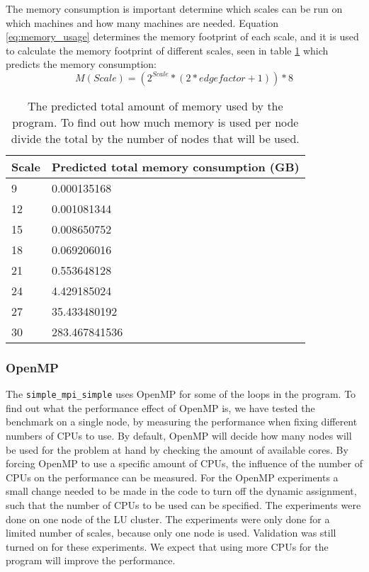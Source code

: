 The memory consumption is important determine which scales can be run on which machines and how many machines are needed. Equation \ref{eq:memory_usage} determines the memory footprint of each scale, and it is used to calculate the memory footprint of different scales, seen in table \ref{tab:calculation memory consumption} which predicts the memory consumption:
\begin{equation}
\label{eq:memory_usage}
M(Scale) = (2^{Scale} *(2*edgefactor + 1)) * 8
\end{equation}
\begin{table} [!h]
	\begin{center}
		\begin{tabular}{|l|l|}
			\hline
			Scale & Predicted total memory consumption (GB) \\ \hline
			9 &  0.000135168 \\ \hline
			12 & 0.001081344 \\ \hline
			15 & 0.008650752 \\ \hline
			18 & 0.069206016 \\ \hline
			21 & 0.553648128 \\ \hline
			24 & 4.429185024 \\ \hline
			27 & 35.433480192 \\ \hline
			30 & 283.467841536 \\ \hline
		\end{tabular}
	\end{center}
	
	\caption{The predicted total amount of memory used by the program. To find out how much memory is used per node divide the total by the number of nodes that will be used.}
	\label{tab:calculation memory consumption}
\end{table}


\subsubsection{OpenMP}
The \texttt{simple\_mpi\_simple} uses OpenMP for some of the loops in the program. To find out what the performance effect of OpenMP is, we have tested the benchmark on a single node, by measuring the performance when fixing different numbers of CPUs to use. By default, OpenMP will decide how many nodes will be used for the problem at hand by checking the amount of available cores. By forcing OpenMP to use a specific amount of CPUs, the influence of the number of CPUs on the performance can be measured. For the OpenMP experiments a small change needed to be made in the code to turn off the dynamic assignment, such that the number of CPUs to be used can be specified. The experiments were done on one node of the LU cluster. The experiments were only done for a limited number of scales, because only one node is used. Validation was still turned on for these experiments. We expect that using more CPUs for the program will improve the performance.

